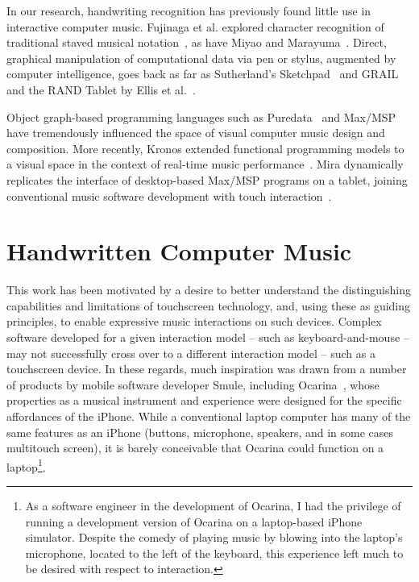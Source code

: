 \documentclass{nime-alternate}
\begin{document}
In our research, handwriting recognition has previously found little use in interactive computer music. 
Fujinaga et al. explored character recognition of traditional staved musical notation~\cite{fujinaga1989computer, fujinaga1996exemplar}, as have Miyao and Marayuma~\cite{miyao2007online}. 
Direct, graphical manipulation of computational data via pen or stylus, augmented by computer intelligence, goes back as far as Sutherland's Sketchpad~\cite{sutherland1964sketch} and GRAIL and the RAND Tablet by Ellis et al.~\cite{davis1964rand}. 

Object graph-based programming languages such as Puredata~\cite{puckette1996pure} and Max/MSP~\cite{zicarelli1998extensible} have tremendously influenced the space of visual computer music design and composition. 
More recently, Kronos extended functional programming models to a visual space in the context of real-time music performance~\cite{norilo2012visualization}. 
Mira dynamically replicates the interface of desktop-based Max/MSP programs on a tablet, joining conventional music software development with touch interaction~\cite{tarakajian2013anmira}. 


%
%

\section{Handwritten Computer Music}
\label{sec:HandwrittenComputerMusic}

This work has been motivated by a desire to better understand the distinguishing capabilities and limitations of touchscreen technology, and, using these as guiding principles, to enable expressive music interactions on such devices. 
Complex software developed for a given interaction model -- such as keyboard-and-mouse -- may not successfully cross over to a different interaction model -- such as a touchscreen device. 
In these regards, much inspiration was drawn from a number of products by mobile software developer Smule, including Ocarina~\cite{wang2014ocarina}, whose properties as a musical instrument and experience were designed for the specific affordances of the iPhone. 
While a conventional laptop computer has many of the same features as an iPhone (buttons, microphone, speakers, and in some cases multitouch screen), it is barely conceivable that Ocarina could function on a laptop\footnote{As a software engineer in the development of Ocarina, I had the privilege of running a development version of Ocarina on a laptop-based iPhone simulator. Despite the comedy of playing music by blowing into the laptop's microphone, located to the left of the keyboard, this experience left much to be desired with respect to interaction.}.
\end{document}
